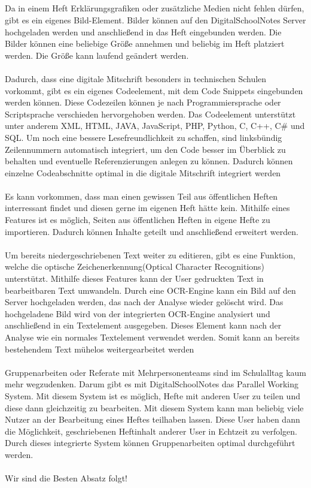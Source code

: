 \\\\\\\\
Da in einem Heft Erklärungsgrafiken oder zusätzliche Medien nicht fehlen dürfen, gibt es ein eigenes Bild-Element. Bilder können auf den DigitalSchoolNotes Server hochgeladen werden und anschließend in das Heft eingebunden werden. Die Bilder können eine beliebige Größe annehmen und beliebig im Heft platziert werden. Die Größe kann laufend geändert werden.\\
\\
Dadurch, dass eine digitale Mitschrift besonders in technischen Schulen vorkommt, gibt es ein eigenes Codeelement, mit dem Code Snippets eingebunden werden können. Diese Codezeilen können je nach Programmiersprache oder Scriptsprache verschieden hervorgehoben werden. Das Codeelement unterstützt unter anderem XML, HTML, JAVA, JavaScript, PHP, Python, C, C++, C\# und SQL. Um noch eine bessere Lesefreundlichkeit zu schaffen, sind linksbündig Zeilennummern automatisch integriert, um den Code besser im Überblick zu behalten und eventuelle Referenzierungen anlegen zu können. Dadurch können einzelne Codeabschnitte optimal in die digitale Mitschrift integriert werden\\
\\
Es kann vorkommen, dass man einen gewissen Teil aus öffentlichen Heften interressant findet und diesen gerne im eigenen Heft hätte kein. Mithilfe eines Features ist es möglich, Seiten aus öffentlichen Heften in eigene Hefte zu importieren. Dadurch können Inhalte geteilt und anschließend erweitert werden. \\
\\
Um bereits niedergeschriebenen Text weiter zu editieren, gibt es eine Funktion, welche die optische Zeichenerkennung(Optical Character Recognitions) unterstützt. Mithilfe dieses Features kann der User gedruckten Text in bearbeitbaren Text umwandeln. Durch eine OCR-Engine kann ein Bild auf den Server hochgeladen werden, das nach der Analyse wieder gelöscht wird. Das hochgeladene Bild wird von der integrierten OCR-Engine analysiert und anschließend in ein Textelement ausgegeben. Dieses Element kann nach der Analyse wie ein normales Textelement verwendet werden. Somit kann an bereits bestehendem Text mühelos weitergearbeitet werden\\
\\
Gruppenarbeiten oder Referate mit Mehrpersonenteams sind im Schulalltag kaum mehr wegzudenken. Darum gibt es mit DigitalSchoolNotes das Parallel Working System. Mit diesem System ist es möglich, Hefte mit anderen User zu teilen und diese dann gleichzeitig zu bearbeiten. Mit diesem System kann man beliebig viele Nutzer an der Bearbeitung eines Heftes teilhaben lassen. Diese User haben dann die Möglichkeit, geschriebenen Heftinhalt anderer User in Echtzeit zu verfolgen. Durch dieses integrierte System können Gruppenarbeiten optimal durchgeführt werden.\\
\\
Wir sind die Besten Absatz folgt!